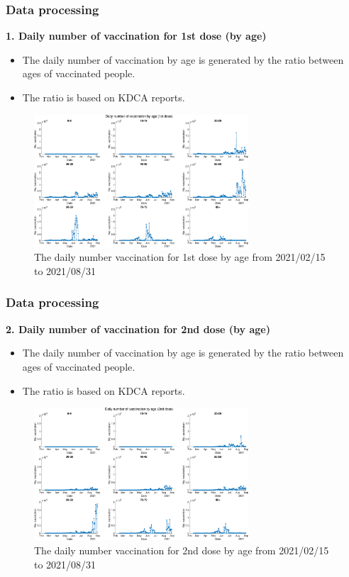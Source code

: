 \documentclass[aspectratio=169, 9pt, xcolor=dvipsnames]{beamer}
\begin{document}
	\begin{frame}\frametitle{Data processing}
	    \textbf{1. Daily number of vaccination for 1st dose (by age)}
	    \begin{itemize}
	    	\item The daily number of vaccination by age is generated by the ratio between ages of vaccinated people.
	    	\item The ratio is based on KDCA reports.
	    \end{itemize}
	    \begin{figure}
	    	\centering
	    	\includegraphics[width=8cm]{../results/data/vaccine_number_by_age_1st.eps}
	    	\caption{The daily number vaccination for 1st dose by age from 2021/02/15 to 2021/08/31}
	    \end{figure}
	\end{frame}

	\begin{frame}\frametitle{Data processing}
	    \textbf{2. Daily number of vaccination for 2nd dose (by age)}
	    \begin{itemize}
	    	\item The daily number of vaccination by age is generated by the ratio between ages of vaccinated people.
	    	\item The ratio is based on KDCA reports.
	    \end{itemize}
	    \begin{figure}
	    	\centering
	    	\includegraphics[width=8cm]{../results/data/vaccine_number_by_age_2nd.eps}
	    	\caption{The daily number vaccination for 2nd dose by age from 2021/02/15 to 2021/08/31}
	    \end{figure}
	\end{frame}
\end{document}
